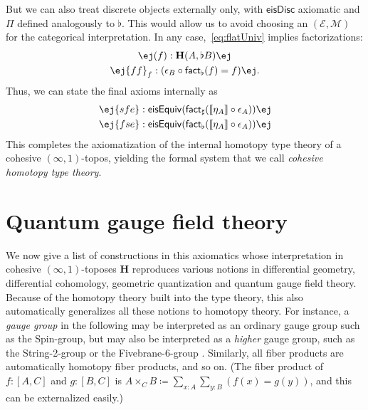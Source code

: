 \documentclass[copyright,12pt]{eptcs}
\makeatletter
\newcommand{\type}{\ensuremath{\mathsf{Type}}\xspace}
\renewcommand{\H}{\ensuremath{\mathbf{H}}\xspace}
\newcommand{\io}{\ensuremath{(\infty,1)}}
\newcommand{\E}{\ensuremath{\mathcal{E}}\xspace}
\newcommand{\M}{\ensuremath{\mathcal{M}}\xspace}
\newcommand{\factsharp}{\textsf{fact}_{\sharp}}
\newcommand{\factflat}{\textsf{fact}_{\flat}}
\def\jd#1{\@jd#1\ej}
\def\@jd#1|-#2\ej{\@@jd#1,,\;\vdash\;\left(#2\right)}
\def\@@jd#1,{\@ifmtarg{#1}{\let\next=\relax}{\left(#1\right)\let\next=\@@@jd}\next}
\def\@@@jd#1,{\@ifmtarg{#1}{\let\next=\relax}{,\,\left(#1\right)\let\next=\@@@jd}\next}
\makeatother
\begin{document}
But we can also treat discrete objects externally only, with $\mathsf{eisDisc}$ axiomatic and $\Pi$ defined analogously to $\flat$.
This would allow us %
to avoid choosing an $(\E,\M)$ for the categorical interpretation.
In any case,~\eqref{eq:flatUniv} implies factorizations:
\begin{gather*}
  \jd{\mathsf{ad}:\mathsf{eisDisc}(A), f:{\H(A,B)} |- \factflat(f):{\H(A,\flat B)}} \\
  \jd{\mathsf{ad}:\mathsf{eisDisc}(A), f:{\H(A,B)} |- \mathsf{ff}_f:(\epsilon_B \circ \factflat(f) = f)}.
\end{gather*}
Thus, we can state the final axioms internally as
\begin{gather}
  \jd{A:\sharp\type |- \mathsf{sfe}:\mathsf{eisEquiv} (\factsharp (\llbracket\eta_A\rrbracket \circ \epsilon_A))} \\
  \jd{A:\sharp\type |- \mathsf{fse}:\mathsf{eisEquiv} (\factflat (\llbracket\eta_A\rrbracket \circ \epsilon_A))}
\end{gather}
This completes the axiomatization of the internal homotopy type theory of a cohesive \io-topos, yielding the formal system that we call \emph{cohesive homotopy type theory}.






\section{Quantum gauge field theory}
\label{sec:quantum}

We now
give a list of constructions in this axiomatics
whose interpretation in cohesive
$(\infty,1)$-toposes \H reproduces various notions in differential geometry,
differential cohomology, geometric quantization and quantum gauge field theory.
Because of the homotopy theory built into the type theory, this also automatically generalizes
all these notions to homotopy theory.  For instance, a
\emph{gauge group} in the following may be interpreted as an ordinary gauge group such
as the Spin-group, but may also be interpreted as a \emph{higher} gauge
group, such as the String-2-group or the Fivebrane-6-group \cite{SSS}.
Similarly, all fiber products are automatically homotopy fiber products, and so on.
(The fiber product of $f:[A,C]$ and $g:[B,C]$ is $A\times_C B \coloneqq \sum_{x:A}\sum_{y:B}(f(x)=g(y))$, and this can be externalized easily.)
\end{document}
